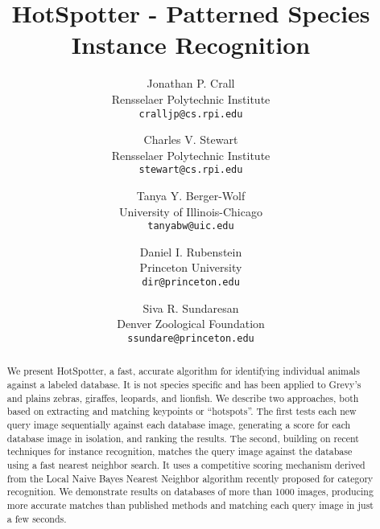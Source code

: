 \documentclass[10pt,twocolumn,letterpaper]{article}
\begin{document}

\title{HotSpotter - Patterned Species Instance Recognition}

\author{Jonathan P. Crall\\
Rensselaer Polytechnic Institute\\
{\tt\small cralljp@cs.rpi.edu}
\and
Charles V. Stewart\\
Rensselaer Polytechnic Institute\\
{\tt\small stewart@cs.rpi.edu}
\and
Tanya Y. Berger-Wolf\\
University of Illinois-Chicago\\
{\tt\small tanyabw@uic.edu}\\
\and
Daniel I. Rubenstein\\
Princeton University\\
{\tt\small dir@princeton.edu}\\
\and
Siva R. Sundaresan\\
Denver Zoological Foundation\\
{\tt\small ssundare@princeton.edu}\\
}

\maketitle

\begin{abstract}
We present HotSpotter, a fast, accurate algorithm
for identifying individual animals against a labeled database.
It is not species specific and has been applied to
Grevy's and plains zebras, giraffes, leopards, and lionfish.
We describe two approaches,
both based on extracting and matching keypoints or ``hotspots''.
The first tests each new query image sequentially against each
database image, generating a score for each database image
in isolation, and ranking the results. The second, building
on recent techniques for instance recognition, matches
the query image against the database using a fast nearest
neighbor search.  It uses a competitive scoring
mechanism derived from the Local Naive Bayes Nearest
Neighbor algorithm recently proposed for category recognition.
We demonstrate results on databases of more than
1000 images, producing more accurate matches than published
methods and matching each query image in just a few seconds.
\end{abstract}















{\small


%

}
\end{document}
